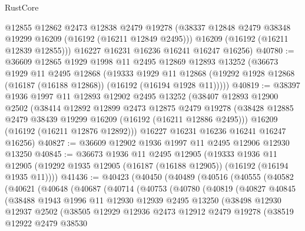 \begin{lexlean}{RustCore}
\begin{coremodule}
        @12855
        @12862
        @2473
        @12838
        @2479
        @19278
        (@38337 @12848 @2479 @38348 @19299 @16209 (@16192 (@16211 @12849 @2495)))
        @16209
        (@16192 (@16211 @12839 @12855)))
      @16227
      @16231
      @16236
      @16241
      @16247
      @16256)
@40780 := @36609
    @12865
    @1929
    @1998
    @11
    @2495
    @12869
    @12893
    @13252
    (@36673
      @1929
      @11
      @2495
      @12868
      (@19333
        @1929
        @11
        @12868
        (@19292 @1928 @12868 (@16187 (@16188 @12868)) (@16192 (@16194 @1928 @11)))))
@40819 := @38397
    @1936
    @1997
    @11
    @12893
    @12902
    @2495
    @13252
    (@38407
      @12893
      @12900
      @2502
      (@38414
        @12892
        @12899
        @2473
        @12875
        @2479
        @19278
        (@38428 @12885 @2479 @38439 @19299 @16209 (@16192 (@16211 @12886 @2495)))
        @16209
        (@16192 (@16211 @12876 @12892)))
      @16227
      @16231
      @16236
      @16241
      @16247
      @16256)
@40827 := @36609 @12902 @1936 @1997 @11 @2495 @12906 @12930 @13250
@40845 := @36673
    @1936
    @11
    @2495
    @12905
    (@19333
      @1936
      @11
      @12905
      (@19292 @1935 @12905 (@16187 (@16188 @12905)) (@16192 (@16194 @1935 @11))))
@41436 := @40423
    (@40450
      (@40489
        (@40516
          (@40555
            (@40582
              (@40621
                (@40648
                  (@40687
                    (@40714
                      (@40753
                        (@40780
                          (@40819
                            (@40827
                              @40845
                              (@38488
                                @1943
                                @1996
                                @11
                                @12930
                                @12939
                                @2495
                                @13250
                                (@38498
                                  @12930
                                  @12937
                                  @2502
                                  (@38505
                                    @12929
                                    @12936
                                    @2473
                                    @12912
                                    @2479
                                    @19278
                                    (@38519
                                      @12922
                                      @2479
                                      @38530

\end{coremodule}
\end{lexlean}
